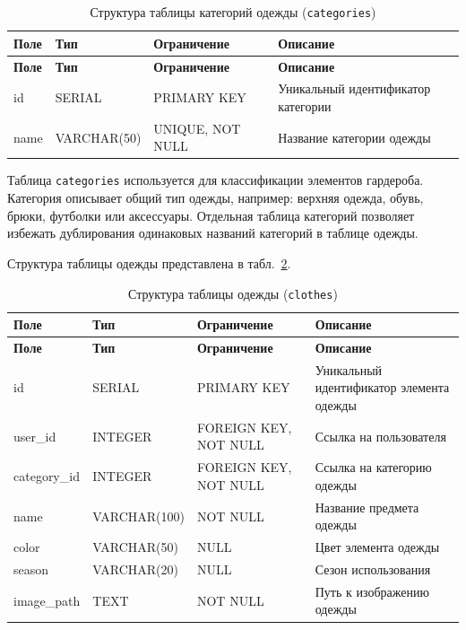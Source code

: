 \begin{longtable}{|l|l|p{3.5cm}|p{5.5cm}|}
	\caption{Структура таблицы категорий одежды (\texttt{categories})}
	\label{tab:db_categories} \\

	\hline
	\textbf{Поле} & \textbf{Тип} & \textbf{Ограничение} & \textbf{Описание} \\ \hline
	\endfirsthead

	\tabcont{\ref{tab:db_categories}}
	\textbf{Поле} & \textbf{Тип} & \textbf{Ограничение} & \textbf{Описание} \\ \hline
	\endhead

	\hline
	\endfoot

	\hline
	\endlastfoot

	id & SERIAL & PRIMARY KEY & Уникальный идентификатор категории \\ \hline
	name & VARCHAR(50) & UNIQUE, NOT NULL & Название категории одежды \\ \hline
\end{longtable}

Таблица \texttt{categories} используется для классификации элементов гардероба. Категория описывает общий тип одежды, например: верхняя одежда, обувь, брюки, футболки или аксессуары. Отдельная таблица категорий позволяет избежать дублирования одинаковых названий категорий в таблице одежды.

Структура таблицы одежды представлена в табл.~\ref{tab:db_clothes}.

\begin{longtable}{|l|l|p{3.5cm}|p{5.5cm}|}
	\caption{Структура таблицы одежды (\texttt{clothes})}
	\label{tab:db_clothes} \\

	\hline
	\textbf{Поле} & \textbf{Тип} & \textbf{Ограничение} & \textbf{Описание} \\ \hline
	\endfirsthead

	\tabcont{\ref{tab:db_clothes}}
	\textbf{Поле} & \textbf{Тип} & \textbf{Ограничение} & \textbf{Описание} \\ \hline
	\endhead

	\hline
	\endfoot

	\hline
	\endlastfoot

	id & SERIAL & PRIMARY KEY & Уникальный идентификатор элемента одежды \\ \hline
	user\_id & INTEGER & FOREIGN KEY, NOT NULL & Ссылка на пользователя \\ \hline
	category\_id & INTEGER & FOREIGN KEY, NOT NULL & Ссылка на категорию одежды \\ \hline
	name & VARCHAR(100) & NOT NULL & Название предмета одежды \\ \hline
	color & VARCHAR(50) & NULL & Цвет элемента одежды \\ \hline
	season & VARCHAR(20) & NULL & Сезон использования \\ \hline
	image\_path & TEXT & NOT NULL & Путь к изображению одежды \\ \hline
\end{longtable}

